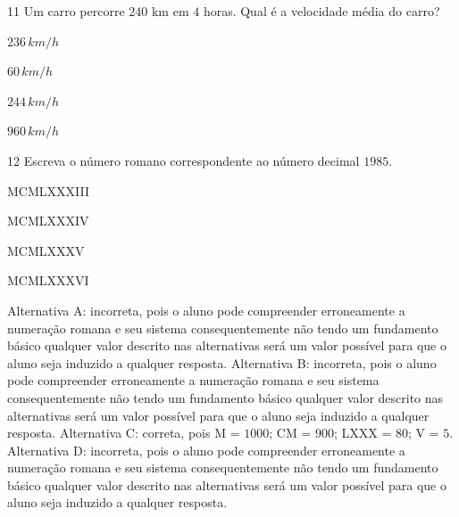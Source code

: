 \num{11} Um carro percorre $240$ km em $4$ horas. Qual é a velocidade média do
carro?

\begin{escolha}
\item $236\,km/h$
\item $60\,km/h$
\item $244\,km/h$
\item $960\,km/h$
\end{escolha}



\num{12} Escreva o número romano correspondente ao número decimal $1985$.

\begin{escolha}
\item MCMLXXXIII
\item MCMLXXXIV
\item MCMLXXXV
\item MCMLXXXVI
\end{escolha}


Alternativa A: incorreta, pois o aluno pode compreender erroneamente a
numeração romana e seu sistema consequentemente não tendo um fundamento
básico qualquer valor descrito nas alternativas será um valor possível
para que o aluno seja induzido a qualquer resposta.
Alternativa B: incorreta, pois o aluno pode compreender erroneamente a
numeração romana e seu sistema consequentemente não tendo um fundamento
básico qualquer valor descrito nas alternativas será um valor possível
para que o aluno seja induzido a qualquer resposta.
Alternativa C: correta, pois M = $1000$; CM = $900$; LXXX = $80$; V = $5$.
Alternativa D: incorreta, pois o aluno pode compreender erroneamente a
numeração romana e seu sistema consequentemente não tendo um fundamento
básico qualquer valor descrito nas alternativas será um valor possível
para que o aluno seja induzido a qualquer resposta.

